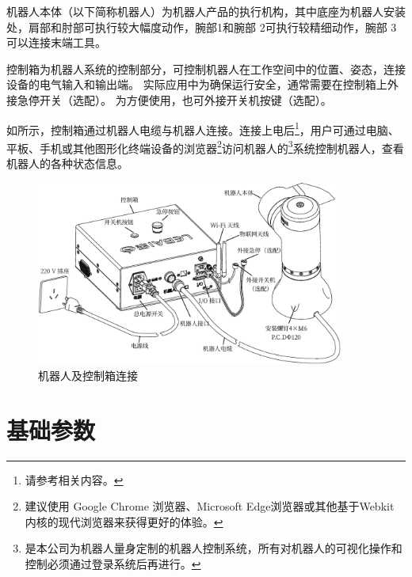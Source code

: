 机器人本体（以下简称机器人）为机器人产品的执行机构，其中底座为机器人安装处，肩部和肘部可执行较大幅度动作，腕部1和腕部 2可执行较精细动作，腕部 3 可以连接末端工具。


控制箱为机器人系统的控制部分，可控制机器人在工作空间中的位置、姿态，连接设备的电气输入和输出端。%
实际应用中为确保运行安全，通常需要在控制箱上外接急停开关（选配）。%
为方便使用，也可外接开关机按键（选配）。

如所示，控制箱通过机器人电缆与机器人连接。连接上电后\footnote{请参考相关内容。}，用户可通过电脑、平板、手机或其他图形化终端设备的浏览器\footnote{建议使用 Google Chrome 浏览器、Microsoft Edge浏览器或其他基于Webkit 内核的现代浏览器来获得更好的体验。 }访问机器人的\LM\footnote{\LM 是本公司为机器人量身定制的机器人控制系统，所有对机器人的可视化操作和控制必须通过登录\LM 系统后再进行。}系统控制机器人，查看机器人的各种状态信息。

\begin{figure}[h!]
    \centering
    \includegraphics[width=0.9\textwidth]{line_graphs/robot_links.pdf}
    \caption{机器人及控制箱连接}
    \label{fig:机器人本体及控制箱连接}
\end{figure}


\section{基础参数}


